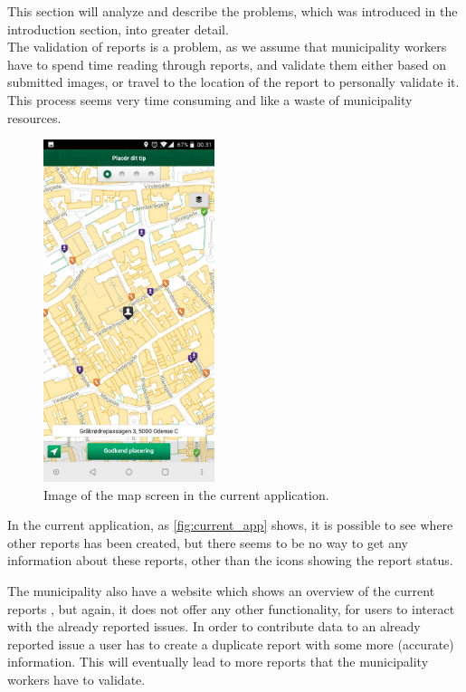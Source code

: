 This section will analyze and describe the problems, which was introduced in the introduction section, into greater detail. 
~\\

The validation of reports is a problem, as we assume that municipality workers have to spend time reading through reports, and validate them either based on submitted images, or travel to the location of the report to personally validate it. This process seems very time consuming and like a waste of municipality resources.

\begin{figure}[hbt]
\centering
\includegraphics[width=5cm]{images/giv_et_tip_current_scr}
\caption{Image of the map screen in the current application.} \label{fig:current_app}
\end{figure}

In the current application, as \autoref{fig:current_app} shows, it is possible to see where other reports has been created, but there seems to be no way to get any information about these reports, other than the icons showing the report status.

The municipality also have a website which shows an overview of the current reports \cite{odense}, but again, it does not offer any other functionality, for users to interact with the already reported issues. In order to contribute data to an already reported issue a user has to create a duplicate report with some more (accurate) information. This will eventually lead to more reports that the municipality workers have to validate.
~\\

